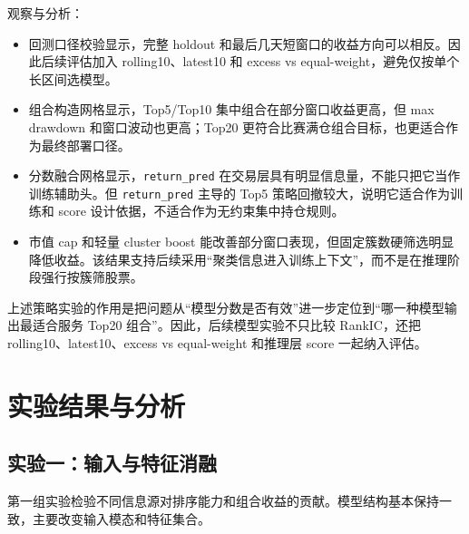 \documentclass[UTF8,a4paper,12pt,fontset=none]{ctexart}
\begin{document}
观察与分析：
\begin{itemize}
  \item 回测口径校验显示，完整 holdout 和最后几天短窗口的收益方向可以相反。因此后续评估加入 rolling10、latest10 和 excess vs equal-weight，避免仅按单个长区间选模型。
  \item 组合构造网格显示，Top5/Top10 集中组合在部分窗口收益更高，但 max drawdown 和窗口波动也更高；Top20 更符合比赛满仓组合目标，也更适合作为最终部署口径。
  \item 分数融合网格显示，\texttt{return\_pred} 在交易层具有明显信息量，不能只把它当作训练辅助头。但 \texttt{return\_pred} 主导的 Top5 策略回撤较大，说明它适合作为训练和 score 设计依据，不适合作为无约束集中持仓规则。
  \item 市值 cap 和轻量 cluster boost 能改善部分窗口表现，但固定簇数硬筛选明显降低收益。该结果支持后续采用“聚类信息进入训练上下文”，而不是在推理阶段强行按簇筛股票。
\end{itemize}

上述策略实验的作用是把问题从“模型分数是否有效”进一步定位到“哪一种模型输出最适合服务 Top20 组合”。因此，后续模型实验不只比较 RankIC，还把 rolling10、latest10、excess vs equal-weight 和推理层 score 一起纳入评估。

\section{实验结果与分析}

\subsection{实验一：输入与特征消融}

第一组实验检验不同信息源对排序能力和组合收益的贡献。模型结构基本保持一致，主要改变输入模态和特征集合。

\begin{table}[H]
  \centering
  \caption{输入与特征消融结果}
  \label{tab:ablation}
\end{table}
\end{document}
